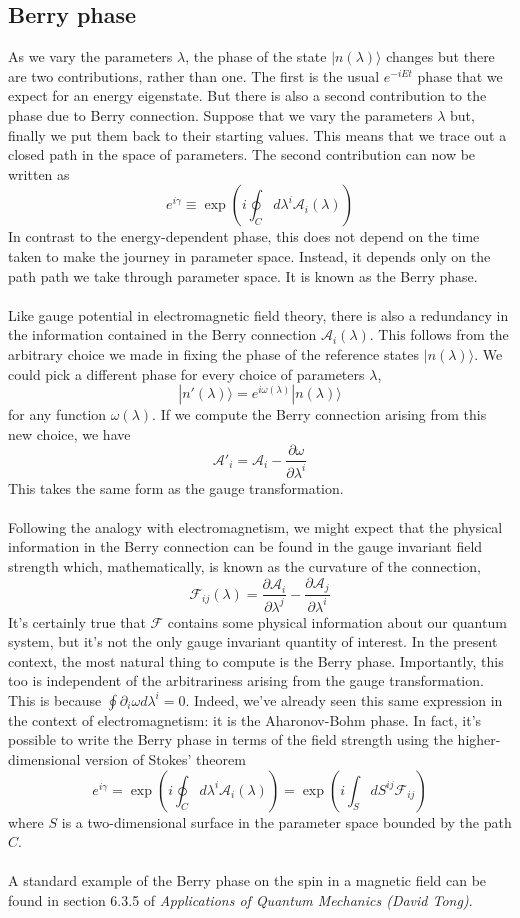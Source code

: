 \documentclass[cyan]{elegantnote}
\begin{document}
\subsection{Berry phase}
As we vary the parameters $\lambda$, the phase of the state $|n(\lambda)\rangle$ changes but there are two contributions, rather than one. 
The first is the usual $e^{-iEt}$ phase that we expect for an energy eigenstate. But there is also a second contribution to the phase due to Berry connection.
Suppose that we vary the parameters $\lambda$ but, finally we put them back to their starting values. 
This means that we trace out a closed path in the space of parameters. The second contribution can now be written as
\[e^{i\gamma} \equiv \exp \left( i\oint_C d\lambda^i \mathcal{A}_i(\lambda) \right)\]
In contrast to the energy-dependent phase, this does not depend on the time taken to make the journey in parameter space. Instead, it depends only on the path path we take through parameter space. It is known as the Berry phase.
\\ \\
Like gauge potential in electromagnetic field theory, there is also a redundancy in the information contained in the Berry connection $\mathcal{A}_i(\lambda)$.
This follows from the arbitrary choice we made in fixing the phase of the reference states $|n(\lambda)\rangle$. We could pick a different phase for every choice of parameters $\lambda$,
\[|n'(\lambda)\rangle = e^{i\omega(\lambda)} |n(\lambda)\rangle\]
for any function $\omega(\lambda)$. 
If we compute the Berry connection arising from this new choice, we have
\[\mathcal{A}'_i = \mathcal{A}_i - \frac{\partial \omega}{\partial \lambda^i} \]
This takes the same form as the gauge transformation.
\\ \\
Following the analogy with electromagnetism, we might expect that the physical information in the Berry connection can be found in the gauge invariant field strength which, mathematically, is known as the curvature of the connection,
\[\mathcal{F}_{ij}(\lambda) = \frac{\partial \mathcal{A}_i}{\partial \lambda^j} -  \frac{\partial \mathcal{A}_j}{\partial \lambda^i}\]
It's certainly true that $\mathcal{F}$ contains some physical information about our quantum system, but it's not the only gauge invariant quantity of interest. In the present context, the most natural thing to compute is the Berry phase. Importantly, this too is independent of the arbitrariness arising from the gauge transformation. 
This is because $\oint \partial_i \omega d\lambda^i = 0$. Indeed, we've already seen this same expression in the context of electromagnetism: it is the Aharonov-Bohm phase.
In fact, it's possible to write the Berry phase in terms of the field strength using the higher-dimensional version of Stokes' theorem
\[e^{i\gamma} = \exp \left( i\oint_C d\lambda^i \mathcal{A}_i(\lambda) \right) = \exp \left( i\int_S dS^{ij} \mathcal{F}_{ij} \right)\]
where $S$ is a two-dimensional surface in the parameter space bounded by the path $C$.
\\ \\
A standard example of the Berry phase on the spin in a magnetic field can be found in section 6.3.5 of 
\emph{Applications of Quantum Mechanics (David Tong)}. 
\end{document}
